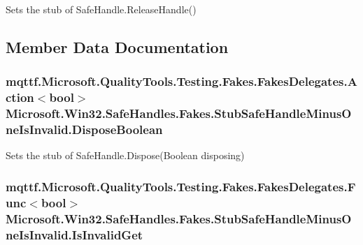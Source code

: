 Sets the stub of Safe\-Handle.\-Release\-Handle()



\subsection{Member Data Documentation}
\hypertarget{class_microsoft_1_1_win32_1_1_safe_handles_1_1_fakes_1_1_stub_safe_handle_minus_one_is_invalid_a16100425278e35fcd688a36f8134567e}{
\subsubsection[{Dispose\-Boolean}]{\setlength{\rightskip}{0pt plus 5cm}mqttf.\-Microsoft.\-Quality\-Tools.\-Testing.\-Fakes.\-Fakes\-Delegates.\-Action$<$bool$>$ Microsoft.\-Win32.\-Safe\-Handles.\-Fakes.\-Stub\-Safe\-Handle\-Minus\-One\-Is\-Invalid.\-Dispose\-Boolean}}\label{class_microsoft_1_1_win32_1_1_safe_handles_1_1_fakes_1_1_stub_safe_handle_minus_one_is_invalid_a16100425278e35fcd688a36f8134567e}


Sets the stub of Safe\-Handle.\-Dispose(\-Boolean disposing)

\hypertarget{class_microsoft_1_1_win32_1_1_safe_handles_1_1_fakes_1_1_stub_safe_handle_minus_one_is_invalid_a1dc18bb53ebfc8a778dd75b6aa918c4d}{
\subsubsection[{Is\-Invalid\-Get}]{\setlength{\rightskip}{0pt plus 5cm}mqttf.\-Microsoft.\-Quality\-Tools.\-Testing.\-Fakes.\-Fakes\-Delegates.\-Func$<$bool$>$ Microsoft.\-Win32.\-Safe\-Handles.\-Fakes.\-Stub\-Safe\-Handle\-Minus\-One\-Is\-Invalid.\-Is\-Invalid\-Get}}\label{class_microsoft_1_1_win32_1_1_safe_handles_1_1_fakes_1_1_stub_safe_handle_minus_one_is_invalid_a1dc18bb53ebfc8a778dd75b6aa918c4d}


